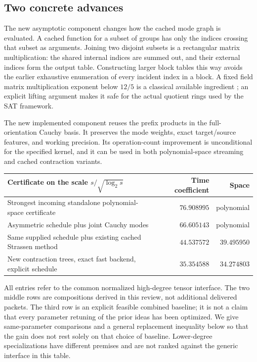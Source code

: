 \documentclass[11pt,letterpaper]{article}
\theoremstyle{definition}\newtheorem{definition}[theorem]{Definition}
\theoremstyle{remark}\newtheorem{remark}[theorem]{Remark}
\begin{document}
\subsection{Two concrete advances}
The new asymptotic component changes how the cached mode graph is evaluated. A cached
function for a subset of groups has only the indices crossing that subset as arguments.
Joining two disjoint subsets is a rectangular matrix multiplication: the shared internal
indices are summed out, and their external indices form the output table. Constructing
larger block tables this way avoids the earlier exhaustive enumeration of every incident
index in a block. A fixed field matrix multiplication exponent below $12/5$ is a classical
available ingredient \cite{mm2024}; an explicit lifting argument makes it safe for the
actual quotient rings used by the SAT framework.

The new implemented component reuses the prefix products in the full-orientation Cauchy
basis. It preserves the mode weights, exact target/source features, and working precision.
Its operation-count improvement is unconditional for the specified kernel, and it can be
used in both polynomial-space streaming and cached contraction variants.

\begin{center}
\begin{tabular}{@{}p{}rr@{}}
\toprule
Certificate on the scale $s/\sqrt{\log_2s}$ & Time coefficient & Space\\
\midrule
Strongest incoming standalone polynomial-space certificate & $76.908995$ & polynomial\\
Asymmetric schedule plus joint Cauchy modes & $66.605143$ & polynomial\\
Same supplied schedule plus existing cached Strassen method & $44.537572$ & $39.495950$\\
New contraction trees, exact fast backend, explicit schedule & $35.354588$ & $34.274803$\\
\bottomrule
\end{tabular}
\end{center}
All entries refer to the common normalized high-degree tensor interface. The two middle
rows are compositions derived in this review, not additional delivered packets.
The third row is an explicit feasible combined baseline; it is not a claim that every
parameter retuning of the prior ideas has been optimized. We give same-parameter
comparisons and a general replacement inequality below so that the gain does not rest
solely on that choice of baseline. Lower-degree specializations have different premises
and are not ranked against the generic interface in this table.
\end{document}
